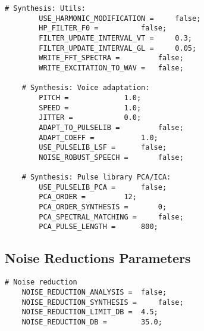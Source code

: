 \begin{lstlisting}[caption = Configuration file]
	# Synthesis: Utils:
		USE_HARMONIC_MODIFICATION = 	false;
		HP_FILTER_F0 = 			false;
		FILTER_UPDATE_INTERVAL_VT = 	0.3;
		FILTER_UPDATE_INTERVAL_GL = 	0.05;
		WRITE_FFT_SPECTRA = 		false;
		WRITE_EXCITATION_TO_WAV = 	false;

	# Synthesis: Voice adaptation:
		PITCH = 			1.0;
		SPEED = 			1.0;
		JITTER = 			0.0;
		ADAPT_TO_PULSELIB = 		false;
		ADAPT_COEFF = 			1.0;
		USE_PULSELIB_LSF = 		false;
		NOISE_ROBUST_SPEECH = 		false;

	# Synthesis: Pulse library PCA/ICA:
		USE_PULSELIB_PCA =		false;
		PCA_ORDER =			12;
		PCA_ORDER_SYNTHESIS =		0;
		PCA_SPECTRAL_MATCHING = 	false;
		PCA_PULSE_LENGTH = 		800;
\end{lstlisting}

\subsection{Noise Reductions Parameters}
\label{glott_conf_noise_red}

\begin{lstlisting}[caption = Noise reduction parameters in GlottHMM's configuration file]
# Noise reduction
	NOISE_REDUCTION_ANALYSIS = 	false;
	NOISE_REDUCTION_SYNTHESIS = 	false;
	NOISE_REDUCTION_LIMIT_DB = 	4.5;
	NOISE_REDUCTION_DB = 		35.0;
\end{lstlisting}